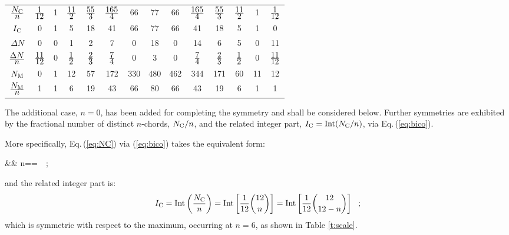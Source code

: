 \documentclass[12pt,a4paper]{article}
\begin{document}
\begin{table}
\begin{center}
\begin{tabular}{|c|c|c|c|c|c|c|c|c|c|c|c|c|c|}
$\displayfrac{N_{\rm C}}n$ & $\displayfrac1{12}$    & 1 & $\displayfrac{11}2$ & $\displayfrac{55}3$ & $\displayfrac{165}4$ &  66 &  77 &  66 & $\displayfrac{165}4$ & $\displayfrac{55}3$ & $\displayfrac{11}2$ &  1 & $\displayfrac1{12}$    \\
$I_{\rm C}$                & \phantom{$$}0          & 1 &  5                  & 18                  &  41                  &  66 &  77 &  66 &  41                  &  18                 &  5                  &  1 &  0                     \\
$\Delta N$                 & \phantom{$$}0          & 0 &  1                  &  2                  &  7                   &   0 &  18 &   0 &  14                  &   6                 &  5                  &  0 & 11                     \\
$\displayfrac{\Delta N}n$  & $\displayfrac{11}{12}$ & 0 & $\displayfrac12$    & $\displayfrac23$    & $\displayfrac74$     & 0   &   3 &   0 & $\displayfrac74$     & $\displayfrac23$    & $\displayfrac12$    &  0 & $\displayfrac{11}{12}$ \\
$N_{\rm M}$                & \phantom{$$}0          & 1 & 12                  & 57                  & 172                  & 330 & 480 & 462 & 344                  & 171                 & 60                  & 11 & 12                     \\
$\displayfrac{N_{\rm M}}n$ & \phantom{$$}1          & 1 &  6                  & 19                  &  43                  &  66 &  80 &  66 &  43                  &  19                 &  6                  &  1 &  1                     \\
\hline                            
\end{tabular}                     
\end{center}                      
\end{table}                       
%                                 
The additional case, $n=0$, has been added for completing the symmetry and
shall be considered below.  Further symmetries
are exhibited by the fractional number of distinct $n$-chords, $N_{\rm C}/n$,
and the related integer part, $I_{\rm C}=\Int(N_{\rm C}/n)$, via
Eq.\,(\ref{eq:bico}).

More specifically, Eq.\,(\ref{eq:NC}) via (\ref{eq:bico}) takes the equivalent
form:
\begin{lefteqnarray}
\label{eq:NCn}
&& n==~~;
\end{lefteqnarray}
and the related integer part is:
\begin{equation}
\label{eq:IC}
I_{\rm C}=\mathop{\rm Int}\nolimits\left(\frac{N_{\rm C}}n\right)=\mathop{\rm Int}\nolimits\left[\frac1{12}
{12\choose n}\right]=\mathop{\rm Int}\nolimits\left[\frac1{12}{12 \choose 12-n}\right]~~;
\end{equation}
which is symmetric with respect to the maximum, occurring at $n=6$, as
shown in Table \ref{t:scale}.
\end{document}
